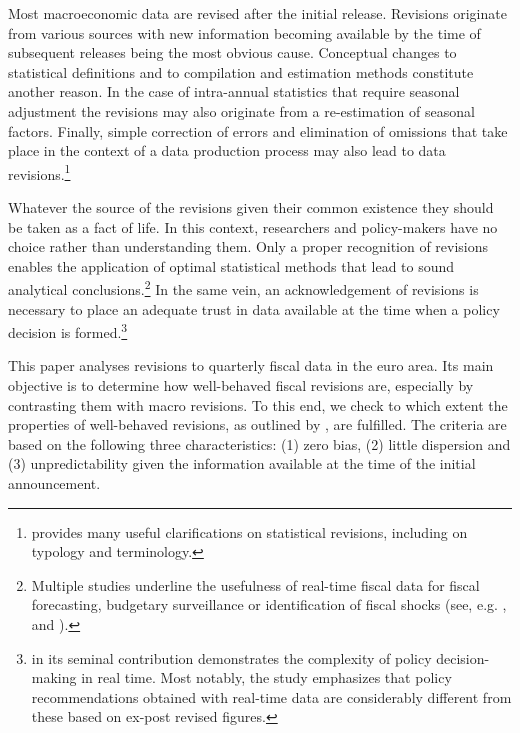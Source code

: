 
Most macroeconomic data are revised after the initial release. Revisions originate from various sources with new information becoming available by the time of subsequent releases being the most obvious cause. Conceptual changes to statistical definitions and to compilation and estimation methods constitute another reason. In the case of intra-annual statistics that require seasonal adjustment the revisions may also originate from a re-estimation of seasonal factors. Finally, simple correction of errors and elimination of omissions that take place in the context of a data production process may also lead to data revisions.\footnote{\citet{carson2004imf} provides many useful clarifications on statistical revisions, including on typology and terminology.} 

Whatever the source of the revisions given their common existence they should be taken as a fact of life. In this context, researchers and policy-makers have no choice rather than understanding them. Only a proper recognition of revisions enables the application of optimal statistical methods that lead to sound analytical conclusions.\footnote{Multiple studies underline the usefulness of real-time fiscal data for fiscal forecasting, budgetary surveillance or identification of fiscal shocks (see, e.g. \citet{Pedegral-Perez_2009_JIF}, \citet{Asimakopoulosetal2020_sje} and \citet{Cimadomo_2016_jes}).} In the same vein, an acknowledgement of revisions is necessary to place an adequate trust in data available at the time when a policy decision is formed.\footnote{\citet{Orphanides_2001_AER} in its seminal contribution demonstrates the complexity of policy decision-making in real time. Most notably, the study emphasizes that policy recommendations obtained with real-time data are considerably different from these based on ex-post revised figures.}


This paper analyses revisions to quarterly fiscal data in the euro area. Its main objective is to determine how well-behaved fiscal revisions are, especially by contrasting them with macro revisions. To this end, we check to which extent the properties of well-behaved revisions, as outlined by \citet{aruoba2006ijcb}, are fulfilled. The criteria are based on the following three characteristics: (1) zero bias, (2) little dispersion and (3) unpredictability given the information available at the time of the initial announcement. 


